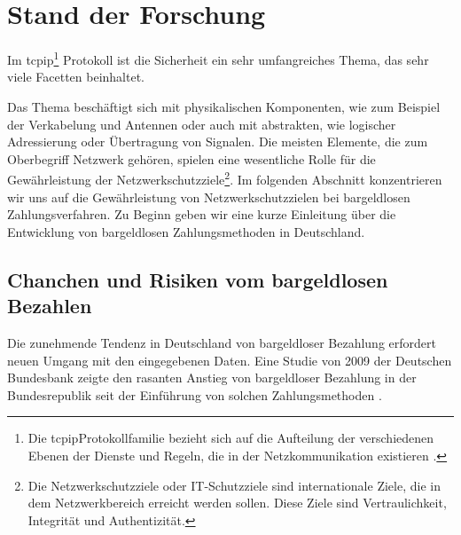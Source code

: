 \section{Stand der Forschung}

Im \acrfull{tcpip}\footnote{Die \acrshort{tcpip}Protokollfamilie bezieht sich auf die Aufteilung 
der verschiedenen Ebenen der Dienste und Regeln, die in der Netzkommunikation existieren \cite{refbook:SWIS}.} Protokoll ist 
die Sicherheit ein sehr umfangreiches Thema, das sehr viele Facetten beinhaltet. 


Das Thema beschäftigt sich mit physikalischen 
Komponenten, wie zum Beispiel der Verkabelung und Antennen oder auch mit abstrakten, wie logischer Adressierung oder 
Übertragung von Signalen. Die meisten Elemente, die zum Oberbegriff Netzwerk gehören, spielen eine wesentliche Rolle 
für die Gewährleistung der Netzwerkschutzziele\footnote{Die Netzwerkschutzziele oder IT-Schutzziele sind internationale
Ziele, die in dem Netzwerkbereich erreicht werden sollen. Diese Ziele sind Vertraulichkeit, Integrität und 
Authentizität.}. Im folgenden Abschnitt konzentrieren wir uns auf die Gewährleistung von Netzwerkschutzzielen
bei bargeldlosen Zahlungsverfahren. Zu Beginn geben wir eine kurze Einleitung über die Entwicklung von bargeldlosen
Zahlungsmethoden in Deutschland.


\subsection{Chanchen und Risiken vom bargeldlosen Bezahlen}

Die zunehmende Tendenz in Deutschland von bargeldloser Bezahlung erfordert neuen Umgang mit den eingegebenen Daten. 
Eine Studie von 2009 der Deutschen Bundesbank zeigte den rasanten Anstieg von bargeldloser Bezahlung in der
Bundesrepublik seit der Einführung von solchen Zahlungsmethoden \cite{refrep:DBCP}.

